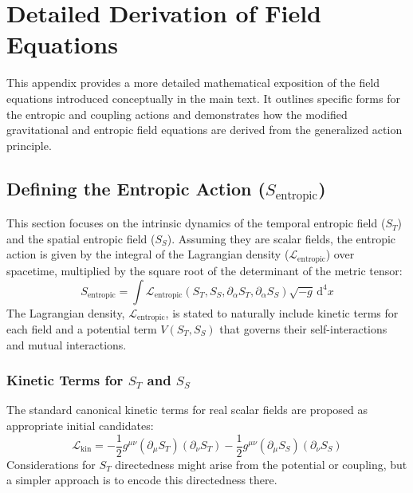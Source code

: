 \documentclass[11pt,a4paper]{article} %
\newcommand{\ST}{S_T}
\newcommand{\SSp}{S_S} %
\newcommand{\Sentropic}{S_{\text{entropic}}}
\begin{document}
\appendix
\section{Detailed Derivation of Field Equations}
\label{app:A}
This appendix provides a more detailed mathematical exposition of the field equations introduced conceptually in the main text. It outlines specific forms for the entropic and coupling actions and demonstrates how the modified gravitational and entropic field equations are derived from the generalized action principle.

\subsection{Defining the Entropic Action ($\Sentropic$)}
This section focuses on the intrinsic dynamics of the temporal entropic field ($\ST$) and the spatial entropic field ($\SSp$). Assuming they are scalar fields, the entropic action is given by the integral of the Lagrangian density ($\mathcal{L}_{\text{entropic}}$) over spacetime, multiplied by the square root of the determinant of the metric tensor:
\begin{equation*}
\Sentropic=\int\mathcal{L}_{\text{entropic}}(\ST,\SSp,\partial_\alpha\ST,\partial_\alpha\SSp)\sqrt{-g}\,\text{d}^4x
\end{equation*}
The Lagrangian density, $\mathcal{L}_{\text{entropic}}$, is stated to naturally include kinetic terms for each field and a potential term $V(\ST,\SSp)$ that governs their self-interactions and mutual interactions.

\subsubsection{Kinetic Terms for $\ST$ and $\SSp$}
The standard canonical kinetic terms for real scalar fields are proposed as appropriate initial candidates:
\begin{equation*}
\mathcal{L}_{\text{kin}}=-\frac{1}{2}g^{\mu\nu}(\partial_\mu\ST)(\partial_\nu\ST)-\frac{1}{2}g^{\mu\nu}(\partial_\mu\SSp)(\partial_\nu\SSp)
\end{equation*}
Considerations for $\ST$ directedness might arise from the potential or coupling, but a simpler approach is to encode this directedness there.
\end{document}
